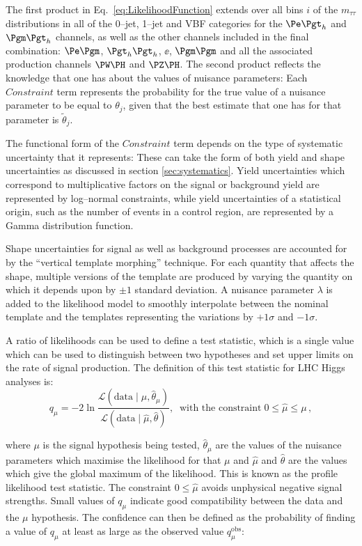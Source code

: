 The first product in Eq.~\ref{eq:LikelihoodFunction} extends over all bins $i$
of the $m_{\tau\tau}$ distributions in all of the 0--jet, 1--jet and VBF categories 
for the $\etau$ and $\mutau$ channels, as well as the other channels included in
the final combination: $\emu$, $\tautau$, $\ee$, $\mumu$ and all the
associated production channels $\PW\PH$ and $\PZ\PH$. 
The second product reflects the knowledge that one has about the values of nuisance parameters:
Each $Constraint$ term represents the probability for the true value of a nuisance parameter to be equal to $\theta_{j}$,
given that the best estimate that one has for that parameter is
$\tilde{\theta}_{j}$.

The functional form of the $Constraint$ term depends on the type of systematic uncertainty that it represents:
These can take the form of both yield and shape uncertainties as discussed in
section \ref{sec:systematics}. Yield uncertainties which correspond
to multiplicative factors on the signal or background yield are represented by
log--normal constraints, while yield uncertainties of a statistical origin,
such as the number of events in a control region, are represented by a Gamma
distribution function. 

Shape uncertainties for signal as well as background processes are accounted 
for by the ``vertical template morphing'' technique. For each quantity that affects the shape,
multiple versions of the template are produced by varying the quantity on which it 
depends upon by $\pm 1$ standard deviation. A nuisance parameter $\lambda$ is added to the likelihood model 
to smoothly interpolate between the nominal template
and the templates representing the variations by $+1 \sigma$ and $-1 \sigma$.

A ratio of likelihoods can be used to define a test statistic, which is a
single value which can be used to distinguish between two hypotheses and set
upper limits on the rate of signal production. The definition of this test
statistic for \ac{LHC} Higgs analyses is: 
\begin{equation}
q_{\mu} = -2
\ln\frac{\mathcal{L}(\mathrm{data}\mid\mu,\hat{\theta}_{\mu})}{\mathcal{L}(\mathrm{data}\mid\hat{\mu},\hat{\theta})},
\;\; \text{with the constraint} \; 0\leq\hat{\mu}\leq\mu\, ,
\label{eq:ProfileLikelihood}
\end{equation}

where $\mu$ is the signal hypothesis being tested, $\hat{\theta}_{\mu}$ are the
values of the nuisance parameters which maximise the likelihood for that $\mu$
and $\hat{\mu}$ and $\hat{\theta}$ are the values which give the global maximum
of the likelihood. This is known as the profile likelihood test statistic. 
The constraint $0\leq\hat{\mu}$ avoids unphysical negative
signal strengths. Small values of $q_{\mu}$ indicate good compatibility between
the data and the $\mu$ hypothesis. The confidence can then be defined as the
probability of finding a value of $q_{\mu}$ at least as large as the observed
value $q_{\mu}^{\mathrm{obs}}$: 

